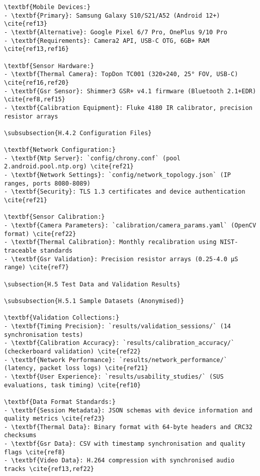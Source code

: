 \begin{verbatim}
\textbf{Mobile Devices:}
- \textbf{Primary}: Samsung Galaxy S10/S21/A52 (Android 12+) \cite{ref13}
- \textbf{Alternative}: Google Pixel 6/7 Pro, OnePlus 9/10 Pro
- \textbf{Requirements}: Camera2 API, USB-C OTG, 6GB+ RAM \cite{ref13,ref16}

\textbf{Sensor Hardware:}
- \textbf{Thermal Camera}: TopDon TC001 (320×240, 25° FOV, USB-C) \cite{ref16,ref20}
- \textbf{Gsr Sensor}: Shimmer3 GSR+ v4.1 firmware (Bluetooth 2.1+EDR) \cite{ref8,ref15}
- \textbf{Calibration Equipment}: Fluke 4180 IR calibrator, precision resistor arrays

\subsubsection{H.4.2 Configuration Files}

\textbf{Network Configuration:}
- \textbf{Ntp Server}: `config/chrony.conf` (pool 2.android.pool.ntp.org) \cite{ref21}
- \textbf{Network Settings}: `config/network_topology.json` (IP ranges, ports 8080-8089)
- \textbf{Security}: TLS 1.3 certificates and device authentication \cite{ref21}

\textbf{Sensor Calibration:}
- \textbf{Camera Parameters}: `calibration/camera_params.yaml` (OpenCV format) \cite{ref22}
- \textbf{Thermal Calibration}: Monthly recalibration using NIST-traceable standards
- \textbf{Gsr Validation}: Precision resistor arrays (0.25-4.0 μS range) \cite{ref7}

\subsection{H.5 Test Data and Validation Results}

\subsubsection{H.5.1 Sample Datasets (Anonymised)}

\textbf{Validation Collections:}
- \textbf{Timing Precision}: `results/validation_sessions/` (14 synchronisation tests)
- \textbf{Calibration Accuracy}: `results/calibration_accuracy/` (checkerboard validation) \cite{ref22}
- \textbf{Network Performance}: `results/network_performance/` (latency, packet loss logs) \cite{ref21}
- \textbf{User Experience}: `results/usability_studies/` (SUS evaluations, task timing) \cite{ref10}

\textbf{Data Format Standards:}
- \textbf{Session Metadata}: JSON schemas with device information and quality metrics \cite{ref23}
- \textbf{Thermal Data}: Binary format with 64-byte headers and CRC32 checksums
- \textbf{Gsr Data}: CSV with timestamp synchronisation and quality flags \cite{ref8}
- \textbf{Video Data}: H.264 compression with synchronised audio tracks \cite{ref13,ref22}


\end{verbatim}
